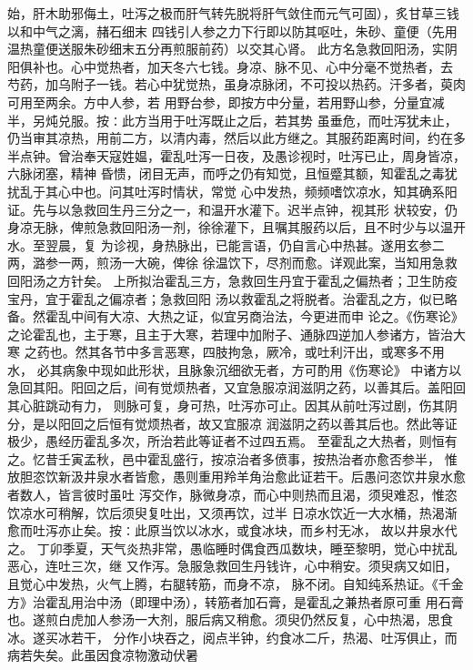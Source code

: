 \documentclass[a4paper,12pt,UTF8,twoside]{ctexbook}
\begin{document}
始，肝木助邪侮土，吐泻之极而肝气转先脱将肝气敛住而元气可固），炙甘草三钱以和中气之漓，赭石细末 
四钱引人参之力下行即以防其呕吐，朱砂、童便（先用温热童便送服朱砂细末五分再煎服前药）以交其心肾。 
此方名急救回阳汤，实阴阳俱补也。心中觉热者，加天冬六七钱。身凉、脉不见、心中分毫不觉热者，去 
芍药，加乌附子一钱。若心中犹觉热，虽身凉脉闭，不可投以热药。汗多者，萸肉可用至两余。方中人参，若 
用野台参，即按方中分量，若用野山参，分量宜减半，另炖兑服。按∶此方当用于吐泻既止之后，若其势 
虽垂危，而吐泻犹未止，仍当审其凉热，用前二方，以清内毒，然后以此方继之。其服药距离时间，约在多 
半点钟。曾治奉天寇姓媪，霍乱吐泻一日夜，及愚诊视时，吐泻已止，周身皆凉，六脉闭塞，精神 
昏愦，闭目无声，而呼之仍有知觉，且恒蹙其额，知霍乱之毒犹扰乱于其心中也。问其吐泻时情状，常觉 
心中发热，频频嗜饮凉水，知其确系阳证。先与以急救回生丹三分之一，和温开水灌下。迟半点钟，视其形 
状较安，仍身凉无脉，俾煎急救回阳汤一剂，徐徐灌下，且嘱其服药以后，且不时少与以温开水。至翌晨，复 
为诊视，身热脉出，已能言语，仍自言心中热甚。遂用玄参二两，潞参一两，煎汤一大碗，俾徐 
徐温饮下，尽剂而愈。详观此案，当知用急救回阳汤之方针矣。 
上所拟治霍乱三方，急救回生丹宜于霍乱之偏热者；卫生防疫宝丹，宜于霍乱之偏凉者；急救回阳 
汤以救霍乱之将脱者。治霍乱之方，似已略备。然霍乱中间有大凉、大热之证，似宜另商治法，今更进而申 
论之。《伤寒论》之论霍乱也，主于寒，且主于大寒，若理中加附子、通脉四逆加人参诸方，皆治大寒 
之药也。然其各节中多言恶寒，四肢拘急，厥冷，或吐利汗出，或寒多不用水， 
必其病象中现如此形状，且脉象沉细欲无者，方可酌用《伤寒论》 
中诸方以急回其阳。阳回之后，间有觉烦热者，又宜急服凉润滋阴之药，以善其后。盖阳回其心脏跳动有力， 
则脉可复，身可热，吐泻亦可止。因其从前吐泻过剧，伤其阴分，是以阳回之后恒有觉烦热者，故又宜服凉 
润滋阴之药以善其后也。然此等证极少，愚经历霍乱多次，所治若此等证者不过四五焉。 
至霍乱之大热者，则恒有之。忆昔壬寅孟秋，邑中霍乱盛行，按凉治者多偾事，按热治者亦愈否参半， 
惟放胆恣饮新汲井泉水者皆愈，愚则重用羚羊角治愈此证若干。后愚问恣饮井泉水愈者数人，皆言彼时虽吐 
泻交作，脉微身凉，而心中则热而且渴，须臾难忍，惟恣饮凉水可稍解，饮后须臾复吐出，又须再饮，过半 
日凉水饮近一大水桶，热渴渐愈而吐泻亦止矣。按∶此原当饮以冰水，或食冰块，而乡村无冰， 
故以井泉水代之。 
丁卯季夏，天气炎热非常，愚临睡时偶食西瓜数块，睡至黎明，觉心中扰乱恶心，连吐三次，继 
又作泻。急服急救回生丹钱许，心中稍安。须臾病又如旧，且觉心中发热，火气上腾，右腿转筋，而身不凉， 
脉不闭。自知纯系热证。《千金方》治霍乱用治中汤（即理中汤），转筋者加石膏，是霍乱之兼热者原可重 
用石膏也。遂煎白虎加人参汤一大剂，服后病又稍愈。须臾仍然反复，心中热渴，思食冰。遂买冰若干， 
分作小块吞之，阅点半钟，约食冰二斤，热渴、吐泻俱止，而病若失矣。此虽因食凉物激动伏暑 
\end{document}
